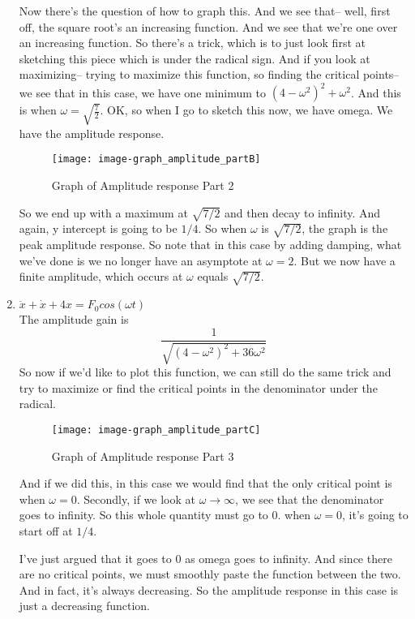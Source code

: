 \begin{enumerate}[label=\textbf{Part.\arabic*}]
  Now there's the question of how to graph this.
  And we see that--
  well, first off, the square root's an increasing function.
  And we see that we're one over an increasing function.
  So there's a trick, which is to just  look first at sketching this piece which
  is under the radical sign.
  And if you look at maximizing-- trying to maximize this
  function, so finding the critical points--
  we see that in this case, we have one minimum to $(4 - \omega ^2)^2 + \omega ^2$.
  And this is when $\omega = \sqrt{\frac{7}{2}}$.
  OK, so when I go to sketch this now, we have omega.
  We have the amplitude response.
  \begin{figure}[ht!]
    \centering
    \texttt{[image: image-graph\_amplitude\_partB]}
    \caption{Graph of Amplitude response Part 2}
  \end{figure}

  So we end up with a maximum at $\sqrt{7/2}$ and then decay to infinity.
  And again, y intercept is going to be $1/4$.
  So when $\omega$ is $\sqrt{7/2}$, the graph is the peak amplitude response.
  So note that in this case by adding damping, what we've done
  is we no longer have an asymptote at $\omega = 2$.
  But we now have a finite amplitude,  which occurs at $\omega$ equals $\sqrt{7/2}$.
  
\item $\ddot x + \dot x + 4x = F_0 cos (\omega t)$ \\
  The amplitude gain is
  \begin{equation*}
     \frac{1}{\sqrt{(4 - \omega ^2)^2 + 36 \omega ^2}}
  \end{equation*}
  So now if we'd like to plot this function,
  we can still do the same trick and try to maximize or find
  the critical points in the denominator under the radical.
  \begin{figure}[ht!]
    \centering
    \texttt{[image: image-graph\_amplitude\_partC]}
    \caption{Graph of Amplitude response Part 3}
  \end{figure}

  And if we did this, in this case we would find that the only critical point
  is when $\omega = 0$. Secondly, if we look at $\omega \to \infty$,
  we see that the denominator goes to infinity.
  So this whole quantity must go to $0$.
  when $\omega = 0$, it's going to start off at $1/4$.

  I've just argued that it goes to 0 as omega goes to infinity.
  And since there are no critical points,
  we must smoothly paste the function between the two.
  And in fact, it's always decreasing.
  So the amplitude response in this case
  is just a decreasing function.


\end{enumerate}
